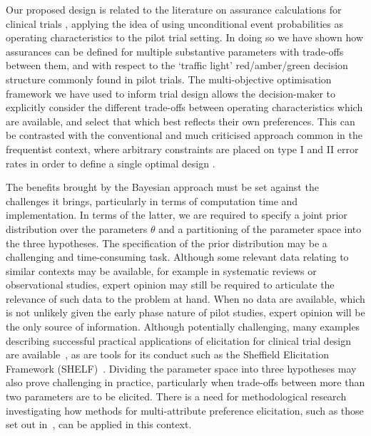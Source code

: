 \documentclass[AMA,STIX1COL]{WileyNJD-v2}
\begin{document}
Our proposed design is related to the literature on assurance calculations for clinical trials \cite{OHagan2005}, applying the idea of using unconditional event probabilities as operating characteristics to the pilot trial setting. In doing so we have shown how assurances can be defined for multiple substantive parameters with trade-offs between them, and with respect to the `traffic light' red/amber/green decision structure commonly found in pilot trials. The multi-objective optimisation framework we have used to inform trial design allows the decision-maker to explicitly consider the different trade-offs between operating characteristics which are available, and select that which best reflects their own preferences. This can be contrasted with the conventional and much criticised approach common in the frequentist context, where arbitrary constraints are placed on type I and II error rates in order to define a single optimal design \cite{Bacchetti2010}.

The benefits brought by the Bayesian approach must be set against the challenges it brings, particularly in terms of computation time and implementation. In terms of the latter, we are required to specify a joint prior distribution over the parameters $\theta$ and a partitioning of the parameter space into the three hypotheses. The specification of the prior distribution may be a challenging and time-consuming task. Although some relevant data relating to similar contexts may be available, for example in systematic reviews or observational studies, expert opinion may still be required to articulate the relevance of such data to the problem at hand. When no data are available, which is not unlikely given the early phase nature of pilot studies, expert opinion will be the only source of information. Although potentially challenging, many examples describing successful practical applications of elicitation for clinical trial design are available~\cite{Walley2015, Crisp2018, Dallow2018}, as are tools for its conduct such as the Sheffield Elicitation Framework (SHELF)~\cite{OHagan2006a}. Dividing the parameter space into three hypotheses may also prove challenging in practice, particularly when trade-offs between more than two parameters are to be elicited. There is a need for methodological research investigating how methods for multi-attribute preference elicitation, such as those set out in~\cite{Keeney1976}, can be applied in this context. 
\end{document}
